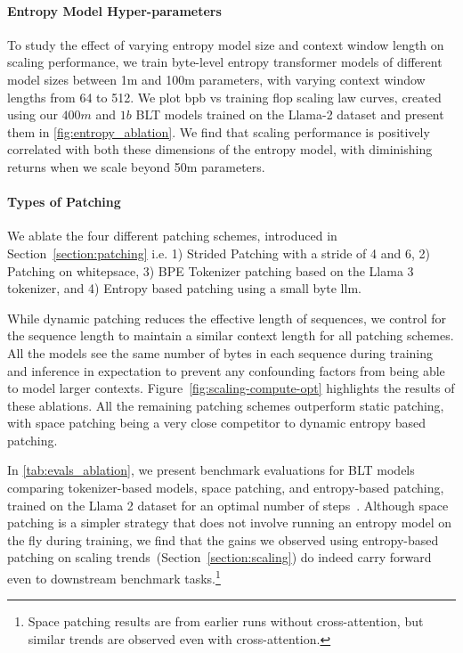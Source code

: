 \paragraph{Entropy Model Hyper-parameters} To study the effect of varying entropy model size and context window length on scaling performance, we train byte-level entropy transformer models of different model sizes between 1m and 100m parameters, with varying context window lengths from 64 to 512. We plot bpb vs training flop scaling law curves, created using our $400m$ and $1b$ {\textsc BLT} models trained on the Llama-2 dataset and present them in \autoref{fig:entropy_ablation}. We find that scaling performance is positively correlated with both these dimensions of the entropy model, with diminishing returns when we scale beyond 50m parameters. 

\paragraph{Types of Patching}

We ablate the four different patching schemes, introduced in Section~\ref{section:patching} i.e. 1) Strided Patching with a stride of 4 and 6, 2) Patching on whitepsace, 3) BPE Tokenizer patching based on the Llama 3 tokenizer, and 4) Entropy based patching using a small byte llm. 

While dynamic patching reduces the effective length of sequences, we control for the sequence length to maintain a similar context length for all patching schemes. All the models see the same number of bytes in each sequence during training and inference in expectation to prevent any confounding factors from being able to model larger contexts. Figure~\ref{fig:scaling-compute-opt} highlights the results of these ablations. All the remaining patching schemes outperform static patching, with space patching being a very close competitor to dynamic entropy based patching. 

In \autoref{tab:evals_ablation}, we present benchmark evaluations for {\textsc BLT} models comparing tokenizer-based models, space patching, and entropy-based patching, trained on the Llama 2 dataset for an optimal number of steps~\citep{dubey2024llama}. Although space patching is a simpler strategy that does not involve running an entropy model on the fly during training, we find that the gains we observed using entropy-based patching on scaling trends~(Section~\ref{section:scaling}) do indeed carry forward even to downstream benchmark tasks.\footnote{Space patching results are from earlier runs without cross-attention, but similar trends are observed even with cross-attention.} 

